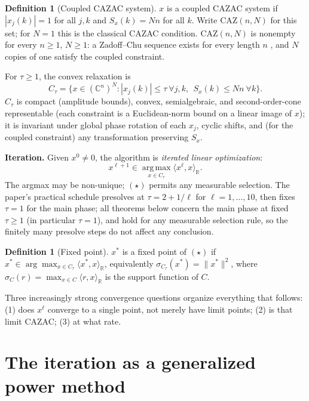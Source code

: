 \documentclass[11pt]{article}
\theoremstyle{plain}
\theoremstyle{definition}
\newtheorem{definition}[theorem]{Definition}
\theoremstyle{remark}
\newcommand{\R}{\mathbb R}
\newcommand{\C}{\mathbb C}
\newcommand{\CAZ}{\mathrm{CAZ}}
\begin{document}
\begin{definition}[Coupled CAZAC system]
$x$ is a coupled CAZAC system if $|x_j(k)|=1$ for all $j,k$ and
$S_x(k)=Nn$ for all $k$. Write $\CAZ(n,N)$ for this set; for $N=1$ this is
the classical CAZAC condition. $\CAZ(n,N)$ is nonempty for every $n\ge1$,
$N\ge1$: a Zadoff--Chu sequence exists for every length $n$ \cite{Chu72},
and $N$ copies of one satisfy the coupled constraint.
\end{definition}

For $\tau\ge1$, the convex relaxation is
$$C_\tau=\bigl\{x\in(\C^n)^N: |x_j(k)|\le\tau\ \forall j,k,\ \ S_x(k)\le Nn\ \forall k\bigr\}.$$
$C_\tau$ is compact (amplitude bounds), convex, semialgebraic, and
second-order-cone representable (each constraint is a Euclidean-norm bound
on a linear image of $x$); it is invariant under global phase rotation of
each $x_j$, cyclic shifts, and (for the coupled constraint) any
transformation preserving $S_x$.

\textbf{Iteration.} Given $x^0\ne0$, the algorithm is \emph{iterated linear
optimization}:
\begin{equation}
x^{\ell+1}\in\operatorname*{arg\,max}_{x\in C_\tau}\langle x^\ell,x\rangle_\R. \tag{$\star$}
\end{equation}
The argmax may be non-unique; $(\star)$ permits any measurable selection.
The paper's practical schedule presolves at $\tau=2+1/\ell$ for
$\ell=1,\dots,10$, then fixes $\tau=1$ for the main phase; all theorems
below concern the main phase at fixed $\tau\ge1$ (in particular $\tau=1$),
and hold for any measurable selection rule, so the finitely many presolve
steps do not affect any conclusion.

\begin{definition}[Fixed point]
$x^*$ is a fixed point of $(\star)$ if
$x^*\in\arg\max_{x\in C_\tau}\langle x^*,x\rangle_\R$, equivalently
$\sigma_{C_\tau}(x^*)=\|x^*\|^2$, where
$\sigma_C(r)=\max_{x\in C}\langle r,x\rangle_\R$ is the support function of $C$.
\end{definition}

Three increasingly strong convergence questions organize everything that
follows: (1) does $x^\ell$ converge to a single point, not merely have
limit points; (2) is that limit CAZAC; (3) at what rate.

\section{The iteration as a generalized power method}
\end{document}

